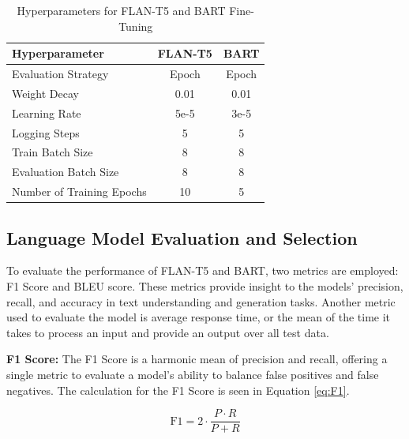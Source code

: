 \documentclass[conference]{IEEEtran}
\begin{document}
\begin{table}[!ht]
    \centering
    \caption{Hyperparameters for FLAN-T5 and BART Fine-Tuning}
    \label{tab:hyperparams}
    \begin{tabular}{l|c|c}
        \toprule
        \textbf{Hyperparameter}         & \textbf{FLAN-T5}         & \textbf{BART} \\
        \midrule
        Evaluation Strategy             & Epoch                   & Epoch                     \\ 
        Weight Decay                    & 0.01                    & 0.01                      \\ 
        Learning Rate                   & 5e-5                    & 3e-5                      \\ 
        Logging Steps                   & 5                       & 5                         \\ 
        Train Batch Size                & 8                       & 8                         \\ 
        Evaluation Batch Size           & 8                       & 8                         \\ 
        Number of Training Epochs       & 10                      & 5                         \\ 
        \bottomrule
    \end{tabular}
\end{table}

\subsection{Language Model Evaluation and Selection}
To evaluate the performance of FLAN-T5 and BART, two metrics are employed: F1 Score and BLEU score. 
These metrics provide insight to the models' precision, recall, and accuracy in text understanding and generation tasks.
Another metric used to evaluate the model is average response time, or the mean of the time it takes to process an input and provide an output over all test data.

\noindent
\textbf{F1 Score:}
The F1 Score is a harmonic mean of precision and recall, offering a single metric to evaluate a model's ability to balance false positives and false negatives.
The calculation for the F1 Score is seen in Equation \ref{eq:F1}.

\begin{equation} \label{eq:F1}
    \text{F1} = 2 \cdot \frac{P \cdot R}{P + R}
\end{equation}
\end{document}
